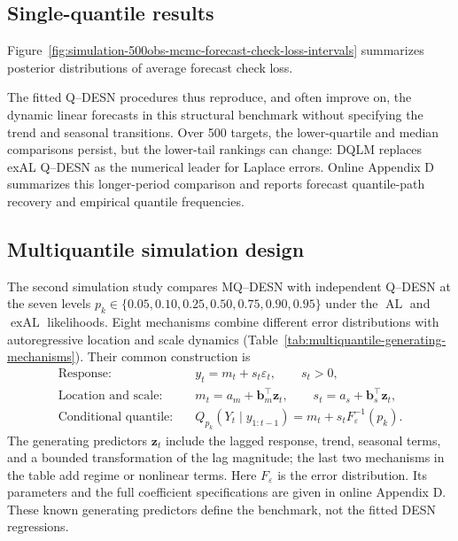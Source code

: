 \documentclass[12pt,letterpaper]{article}
\numberwithin{equation}{section}
\newcommand{\vect}[1]{\bm{#1}}
\newcommand{\AL}{\operatorname{AL}}
\newcommand{\exAL}{\operatorname{exAL}}
\begin{document}
\subsection{Single-quantile results}
\label{subsec:simulation-single-results}

Figure~\ref{fig:simulation-500obs-mcmc-forecast-check-loss-intervals}
summarizes posterior distributions of average forecast check loss.




\clearpage

The fitted Q--DESN procedures thus reproduce, and often improve on, the
dynamic linear forecasts in this structural benchmark without specifying
the trend and seasonal transitions. Over 500 targets, the lower-quartile
and median comparisons persist, but the lower-tail rankings can change:
DQLM replaces exAL Q--DESN as the numerical leader for Laplace errors.
Online Appendix D summarizes this longer-period comparison and reports
forecast quantile-path recovery and empirical quantile frequencies.

\subsection{Multiquantile simulation design}
\label{subsec:simulation-mq-design}

The second simulation study compares MQ--DESN with independent Q--DESN at the
seven levels
\(p_k\in\{0.05,0.10,0.25,0.50,0.75,0.90,0.95\}\)
under the \(\AL\) and \(\exAL\) likelihoods. Eight mechanisms combine
different error distributions with autoregressive location and scale
dynamics (Table~\ref{tab:multiquantile-generating-mechanisms}). Their
common construction is
\begin{equation}
\begin{aligned}
\text{Response:}\quad &y_t=m_t+s_t\varepsilon_t,\qquad s_t>0,\\
\text{Location and scale:}\quad
&m_t=a_m+\vect b_m^\top\vect z_t,\qquad
s_t=a_s+\vect b_s^\top\vect z_t,\\
\text{Conditional quantile:}\quad
&Q_{p_k}(Y_t\mid y_{1:t-1})=m_t+s_t F_\varepsilon^{-1}(p_k).
\end{aligned}
\label{eq:multiquantile-dgp-main}
\end{equation}
The generating predictors \(\vect z_t\) include the lagged response,
trend, seasonal terms, and a bounded transformation of the lag magnitude;
the last two mechanisms in the table add regime or nonlinear terms.
Here \(F_\varepsilon\) is the error distribution. Its parameters and
the full coefficient specifications are given in online Appendix D. These
known generating predictors define the benchmark, not the fitted DESN
regressions.
\end{document}
